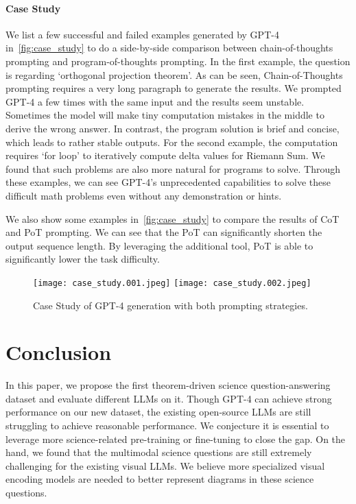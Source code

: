 \documentclass[11pt]{article}
\begin{document}
\paragraph{Case Study}
We list a few successful and failed examples generated by GPT-4 in~\autoref{fig:case_study} to do a side-by-side comparison between chain-of-thoughts prompting and program-of-thoughts prompting. In the first example, the question is regarding `orthogonal projection theorem'. As can be seen, Chain-of-Thoughts prompting requires a very long paragraph to generate the results. We prompted GPT-4 a few times with the same input and the results seem unstable. Sometimes the model will make tiny computation mistakes in the middle to derive the wrong answer. In contrast, the program solution is brief and concise, which leads to rather stable outputs. For the second example, the computation requires `for loop' to iteratively compute delta values for Riemann Sum. We found that such problems are also more natural for programs to solve. Through these examples, we can see GPT-4's unprecedented capabilities to solve these difficult math problems even without any demonstration or hints.   

We also show some examples in~\autoref{fig:case_study} to compare the results of CoT and PoT prompting. We can see that the PoT can significantly shorten the output sequence length. By leveraging the additional tool, PoT is able to significantly lower the task difficulty.

\begin{figure*}[!h]
    \centering
    \texttt{[image: case\_study.001.jpeg]}
    \texttt{[image: case\_study.002.jpeg]}
    \caption{Case Study of GPT-4 generation with both prompting strategies.}
    \label{fig:case_study}
    \vspace{-3ex}
\end{figure*}

\section{Conclusion}
In this paper, we propose the first theorem-driven science question-answering dataset and evaluate different LLMs on it. Though GPT-4 can achieve strong performance on our new dataset, the existing open-source LLMs are still struggling to achieve reasonable performance. We conjecture it is essential to leverage more science-related pre-training or fine-tuning to close the gap. On the hand, we found that the multimodal science questions are still extremely challenging for the existing visual LLMs. We believe more specialized visual encoding models are needed to better represent diagrams in these science questions. 
\end{document}
